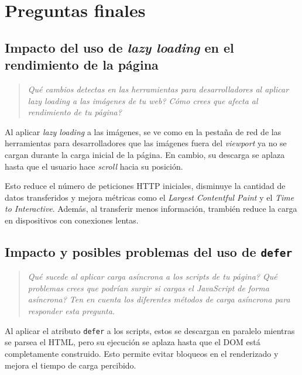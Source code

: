 \documentclass{article}
\begin{document}
\section{Preguntas finales}\label{sec:preguntas-finales}

\subsection{Impacto del uso de \textit{lazy loading} en el rendimiento de la página}\label{subsec:impacto-de-lazy-loading}

\begin{quotation}
\textit{\textquestiondown Qué cambios detectas en las herramientas para desarrolladores al aplicar lazy loading a las imágenes de tu web? \textquestiondown Cómo crees que afecta al rendimiento de tu página?}
\end{quotation}

Al aplicar \textit{lazy loading} a las imágenes, se ve como en la pestaña de red de las herramientas para desarrolladores que las imágenes fuera del \textit{viewport} ya no se cargan durante la carga inicial de la página. En cambio, su descarga se aplaza hasta que el usuario hace \textit{scroll} hacia su posición.

Esto reduce el número de peticiones HTTP iniciales, disminuye la cantidad de datos transferidos y mejora métricas como el \textit{Largest Contentful Paint} y el \textit{Time to Interactive}. Además, al transferir menos información, trambién reduce la carga en dispositivos con conexiones lentas.

\subsection{Impacto y posibles problemas del uso de \texttt{defer}}\label{subsec:impacto-y-problemas-de-defer}

\begin{quotation}
\textit{\textquestiondown Qué sucede al aplicar carga asíncrona a los scripts de tu página? \textquestiondown Qué problemas crees que podrían surgir si cargas el JavaScript de forma asíncrona? Ten en cuenta los diferentes métodos de carga asíncrona para responder esta pregunta.}
\end{quotation}

Al aplicar el atributo \texttt{defer} a los scripts, estos se descargan en paralelo mientras se parsea el HTML, pero su ejecución se aplaza hasta que el DOM está completamente construido. Esto permite evitar bloqueos en el renderizado y mejora el tiempo de carga percibido.
\end{document}
